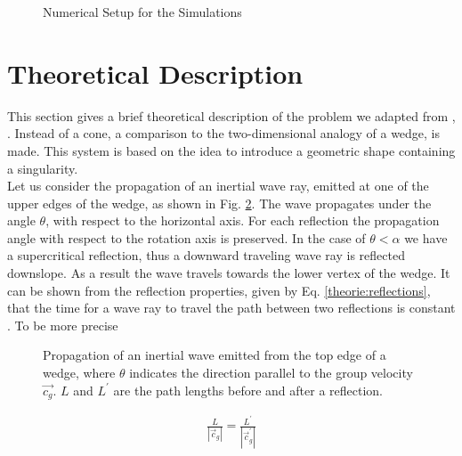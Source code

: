 \begin{figure}[!bp]
  \centering
      \caption{Numerical Setup for the Simulations \label{cone:setup_image} }
\end{figure}
\clearpage

\section{Theoretical Description}
\label{cone:theorie_theo}

This section gives a brief theoretical description of the problem we adapted from \citep{Greenspan1969}, \citep{Beardsley1970}.
Instead of a cone, a comparison to the two-dimensional analogy of a wedge, is made.
This system is based on the idea to introduce a geometric shape containing a singularity.\\
Let us consider the propagation of an inertial wave ray, emitted at one of the upper edges of
the wedge, as shown in Fig. \ref{cone:theorie}.
The wave propagates under the angle $\theta$, with respect to the horizontal axis.
For each reflection the propagation angle with respect to the rotation axis is preserved.
In the case of $\theta<\alpha$ we have a supercritical reflection,
thus a downward traveling wave ray is reflected downslope.
As a result the wave travels towards the lower vertex of the wedge.
It can be shown from the reflection properties, given by Eq. \ref{theorie:reflections},
that the time for a wave ray to travel the path between two reflections is constant \citep{Beardsley1970}.
To be more precise
\begin{figure}[!bp]
  \begin{minipage}[c]{0.6\textwidth}
      \centering
  \end{minipage}
  \begin{minipage}[c]{0.3\textwidth}
      \caption{
          Propagation of an inertial wave emitted from the top edge of a wedge,
           where $\theta$ indicates the direction parallel to the group velocity
            $\vec{c_g}$.  $L$ and $L^{\prime}$ are the path lengths before and after a reflection.
      \label{cone:theorie}
      }
  \end{minipage}
\end{figure}


\begin{align}
    \frac{L}{|\vec{c}_g|} = \frac{L^{\prime}}{|\vec{c}_g^{\prime}|}
\end{align}

